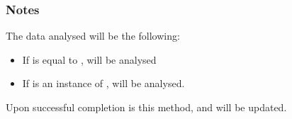 \documentclass[letterpaper,10pt,english]{sphinxmanual}
\begin{document}
\begin{fulllineitems}
\begin{fulllineitems}
\subsubsection*{Notes}

\sphinxAtStartPar
The data analysed will be the following:
\begin{itemize}
\item {} 
\sphinxAtStartPar
If  is equal to ,  will be
analysed

\item {} 
\sphinxAtStartPar
If  is an instance of
{\hyperref[\detokenize{references/freqfilter:nmrespy.freqfilter.FrequencyFilter}]{}},
 will be analysed.

\end{itemize}

\sphinxAtStartPar
Upon successful completion is this method,  and
 will be updated.


\nopagebreak


\sphinxAtStartPar
{\hyperref[\detokenize{references/nlp/nlp:nmrespy.nlp.nlp.NonlinearProgramming}]{}}



\end{fulllineitems}



\end{fulllineitems}
\end{document}
